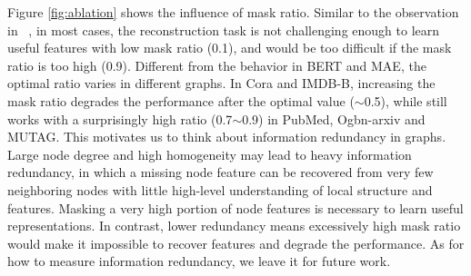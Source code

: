{ Figure \ref{fig:ablation} shows the influence of mask ratio. Similar to the observation in ~\cite{he2021masked}, in most cases, the reconstruction task is not challenging enough to learn useful features with low mask ratio (0.1), and would be too difficult if the mask ratio is too high (0.9). Different from the behavior in BERT and MAE, the optimal ratio varies in different graphs. In Cora and IMDB-B, increasing the mask ratio degrades the performance after the optimal value ($\sim$0.5), while \model still works with a surprisingly high ratio (0.7$\sim$0.9) in PubMed, Ogbn-arxiv and MUTAG. This motivates us to think about information redundancy in graphs. Large node degree and high homogeneity may lead to heavy information redundancy, in which a missing node feature can be recovered from very few neighboring nodes with little high-level understanding of local structure and features. Masking a very high portion of node features is necessary to learn useful representations. In contrast, lower redundancy means excessively high mask ratio would make it impossible to recover features and degrade the performance. As for how to measure information redundancy, we leave it for future work. 












}
